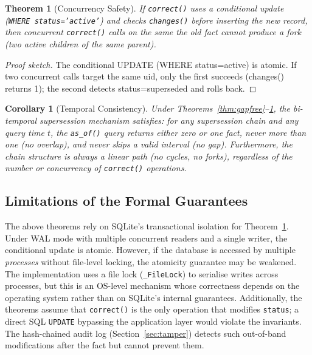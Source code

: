 \documentclass[11pt]{article}
\newtheorem{theorem}{Theorem}
\newtheorem{corollary}{Corollary}
\begin{document}
\begin{theorem}[Concurrency Safety]
\label{theorem:concurrency}
If \texttt{correct()} uses a conditional update (\texttt{WHERE status='active'}) and checks \texttt{changes()} before inserting the new record, then concurrent \texttt{correct()} calls on the same the old fact cannot produce a fork (two active children of the same parent).
\end{theorem}

\begin{proof}[Proof sketch]
The conditional UPDATE (WHERE status=active) is atomic. If two concurrent calls target the same uid, only the first succeeds (changes() returns 1); the second detects status=superseded and rolls back.
\end{proof}

\begin{corollary}[Temporal Consistency]
\label{cor:consistency}
Under Theorems~\ref{thm:gapfree}--\ref{theorem:concurrency}, the bi-temporal supersession mechanism satisfies: for any supersession chain and any query time $t$, the \texttt{as\_of()} query returns either zero or one fact, never more than one (no overlap), and never skips a valid interval (no gap). Furthermore, the chain structure is always a linear path (no cycles, no forks), regardless of the number or concurrency of \texttt{correct()} operations.
\end{corollary}

\subsection{Limitations of the Formal Guarantees}

The above theorems rely on SQLite's transactional isolation for Theorem~\ref{theorem:concurrency}. Under WAL mode with multiple concurrent readers and a single writer, the conditional update is atomic. However, if the database is accessed by multiple \emph{processes} without file-level locking, the atomicity guarantee may be weakened. The implementation uses a file lock (\texttt{\_FileLock}) to serialise writes across processes, but this is an OS-level mechanism whose correctness depends on the operating system rather than on SQLite's internal guarantees. Additionally, the theorems assume that \texttt{correct()} is the only operation that modifies \texttt{status}; a direct SQL \texttt{UPDATE} bypassing the application layer would violate the invariants. The hash-chained audit log (Section~\ref{sec:tamper}) detects such out-of-band modifications after the fact but cannot prevent them.
\end{document}

